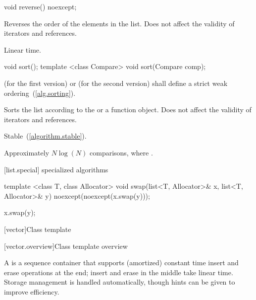 %
\begin{itemdecl}
void reverse() noexcept;
\end{itemdecl}

\begin{itemdescr}
\pnum
\effects
Reverses the order of the elements in the list.
Does not affect the validity of iterators and references.

\pnum
\complexity
Linear time.
\end{itemdescr}

%
\begin{itemdecl}
void sort();
template <class Compare> void sort(Compare comp);
\end{itemdecl}

\begin{itemdescr}
\pnum
\requires
{}
(for the first
version)
or
(for the second version)
shall define a strict weak ordering~(\ref{alg.sorting}).

\pnum
\effects
Sorts the list according to the  or a  function object.
Does not affect the validity of iterators and references.

\pnum
\remarks Stable~(\ref{algorithm.stable}).

\pnum
\complexity
Approximately
$N \log(N)$
comparisons, where
.
\end{itemdescr}

[list.special]{ specialized algorithms}

%
%
\begin{itemdecl}
template <class T, class Allocator>
  void swap(list<T, Allocator>& x, list<T, Allocator>& y)
    noexcept(noexcept(x.swap(y)));
\end{itemdecl}

\begin{itemdescr}
\pnum
\effects
\begin{codeblock}
x.swap(y);
\end{codeblock}
\end{itemdescr}

[vector]{Class template }

[vector.overview]{Class template  overview}

\pnum
{}%
A
is a sequence container that supports
(amortized) constant time insert and erase operations at the end;
insert and erase in the middle take linear time.
Storage management is handled automatically, though hints can be given
to improve efficiency.

